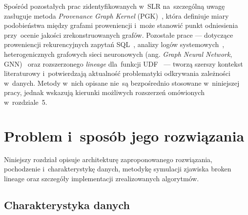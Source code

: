 \documentclass[polish,master,a4paper,oneside]{ppfcmthesis}
\begin{document}
Spośród pozostałych prac zidentyfikowanych w~SLR na~szczególną uwagę
zasługuje metoda \emph{Provenance Graph Kernel} (PGK)~\cite{KohanMarzagao2023},
która definiuje miary podobieństwa między grafami proweniencji i~może
stanowić punkt odniesienia przy~ocenie jakości zrekonstruowanych grafów.
Pozostałe prace — dotyczące proweniencji rekurencyjnych zapytań
SQL~\cite{Dietrich2022}, analizy logów systemowych~\cite{Psallidas2022},
heterogenicznych grafowych sieci neuronowych (ang. \emph{Graph Neural
Network}, GNN)~\cite{Shan2023} oraz rozszerzonego \emph{lineage}
dla~funkcji UDF~\cite{Yamada2023} — tworzą szerszy kontekst literaturowy
i~potwierdzają aktualność problematyki odkrywania zależności w~danych.
Metody w~nich opisane nie~są bezpośrednio stosowane w~niniejszej pracy,
jednak wskazują kierunki możliwych rozszerzeń omówionych w~rozdziale~5.

\chapter{Problem i~sposób jego rozwiązania}

Niniejszy rozdział opisuje architekturę zaproponowanego rozwiązania,
pochodzenie i~charakterystykę danych, metodykę symulacji zjawiska broken
lineage oraz szczegóły implementacji zrealizowanych algorytmów.

\section{Charakterystyka danych}
\label{sec:dane}
\end{document}
